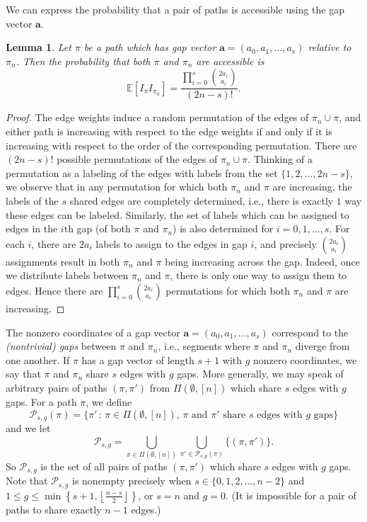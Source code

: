 \documentclass[11pt]{article}
\newtheorem{lemma}[theorem]{Lemma}
\theoremstyle{definition}
\theoremstyle{remark}
\theoremstyle{remark}
\numberwithin{theorem}{section}
\newcommand{\E}{\mathbb{E}}
\begin{document}
We can express the probability that a pair of paths is accessible using the gap vector $\bm{a}$.

\begin{lemma}\label{lem:int_probability}
Let $\pi$ be a path which has gap vector $\bm{a} = (a_{0},a_{1},\dots,a_{s})$ relative to $\pi_{n}$. Then the probability that both $\pi$ and $\pi_{n}$ are accessible is 
$$
	\E[I_{\pi}I_{\pi_{n}}] = \frac{\prod_{i=0}^{s}\binom{2a_{i}}{a_{i}}}{(2n-s)!}.
$$
\end{lemma}

\begin{proof}
The edge weights induce a random permutation of the edges of $\pi_{n} \cup \pi$, and either path is increasing with respect to the edge weights if and only if it is increasing with respect to the order of the corresponding permutation. There are $(2n-s)!$ possible permutations of the edges of $\pi_{n} \cup \pi$. Thinking of a permutation as a labeling of the edges with labels from the set $\{1,2,\dots,2n-s\}$, we observe that in any permutation for which both $\pi_{n}$ and $\pi$ are increasing, the labels of the $s$ shared edges are completely determined, i.e., there is exactly $1$ way these edges can be labeled. Similarly, the set of labels which can be assigned to edges in the $i$th gap (of both $\pi$ and $\pi_{n}$) is also determined for $i=0,1,\dots,s$. For each $i$, there are $2a_{i}$ labels to assign to the edges in gap $i$, and precisely $\binom{2a_{i}}{a_{i}}$ assignments result in both $\pi_{n}$ and $\pi$ being increasing across the gap. Indeed, once we distribute labels between $\pi_n$ and $\pi$, there is only one way to assign them to edges. Hence there are $\prod_{i=0}^{s}\binom{2a_{i}}{a_{i}}$ permutations for which both $\pi_{n}$ and $\pi$ are increasing.
\end{proof}

The nonzero coordinates of a gap vector $\bm{a} = (a_{0}, a_{1}, \dots,a_{s})$ correspond to the \textit{(nontrivial) gaps} between $\pi$ and $\pi_{n}$, i.e., segments where $\pi$ and $\pi_{n}$ diverge from one another. If $\pi$ has a gap vector of length $s+1$ with $g$ nonzero coordinates, we say that $\pi$ and $\pi_{n}$ share $s$ edges with $g$ gaps. More generally, we may speak of arbitrary pairs of paths $(\pi,\pi')$ from $\Pi(\emptyset,[n])$ which share $s$ edges with $g$ gaps. For a path $\pi$, we define
$$
	\mathcal{P}_{s,g}(\pi) = \{\pi'\,:\,\pi \in \Pi(\emptyset,[n]),\,\pi\text{ and }\pi'\text{ share }s\text{ edges with }g\text{ gaps}\}
$$
and we let 
\begin{equation}\label{eq:Psg}
	\mathcal{P}_{s,g} = \bigcup_{\pi \in \Pi(\emptyset,[n])}\bigcup_{\pi' \in \mathcal{P}_{s,g}(\pi)}\Big\{(\pi,\pi') \Big\}.
\end{equation}
So $\mathcal{P}_{s,g}$ is the set of all pairs of paths $(\pi,\pi')$ which share $s$ edges with $g$ gaps. Note that $\mathcal{P}_{s,g}$ is nonempty precisely when $s \in \{0,1,2,\dots,n-2\}$ and $1 \leq g \leq \min\left\{s+1, \left\lfloor\frac{n-s}{2}\right\rfloor \right\}$, or $s = n$ and $g = 0$. (It is impossible for a pair of paths to share exactly $n-1$ edges.) 
\end{document}
